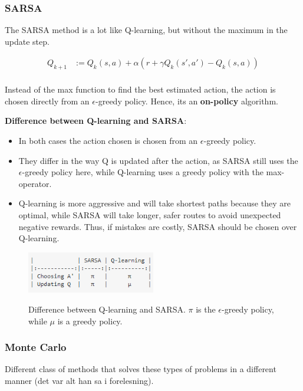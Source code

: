 \subsubsection{SARSA}

The SARSA method is a lot like Q-learning, but without the maximum in the update step.

\begin{align}
    Q_{k+1} &:= Q_k(s, a) + \alpha(r + \gamma Q_k(s', a') - Q_k(s, a)) \\
    \label{eq:qlearn}
\end{align}

Instead of the max function to find the best estimated action, the action is chosen directly from an $\epsilon$-greedy policy. Hence, its an \textbf{on-policy} algorithm.

\textbf{Difference between Q-learning and SARSA}:
\begin{itemize}
    \item In both cases the action chosen is chosen from an $\epsilon$-greedy policy.
    \item They differ in the way Q is updated after the action, as SARSA still uses the $\epsilon$-greedy policy here, while Q-learning uses a greedy policy with the max-operator. 
    \item Q-learning is more aggressive and will take shortest paths because they are optimal, while SARSA will take longer, safer routes to avoid unexpected negative rewards. Thus, if mistakes are costly, SARSA should be chosen over Q-learning.
\end{itemize}

\begin{figure}[h]
    \centering
        \includegraphics[width=0.5\textwidth]{figures/solving/sarsa_q.PNG}\\
        \caption{Difference between Q-learning and SARSA. $\pi$ is the $\epsilon$-greedy policy, while $\mu$ is a greedy policy.}
\end{figure}

\subsubsection{Monte Carlo}

Different class of methods that solves these types of problems in a different manner (det var alt han sa i forelesning).


